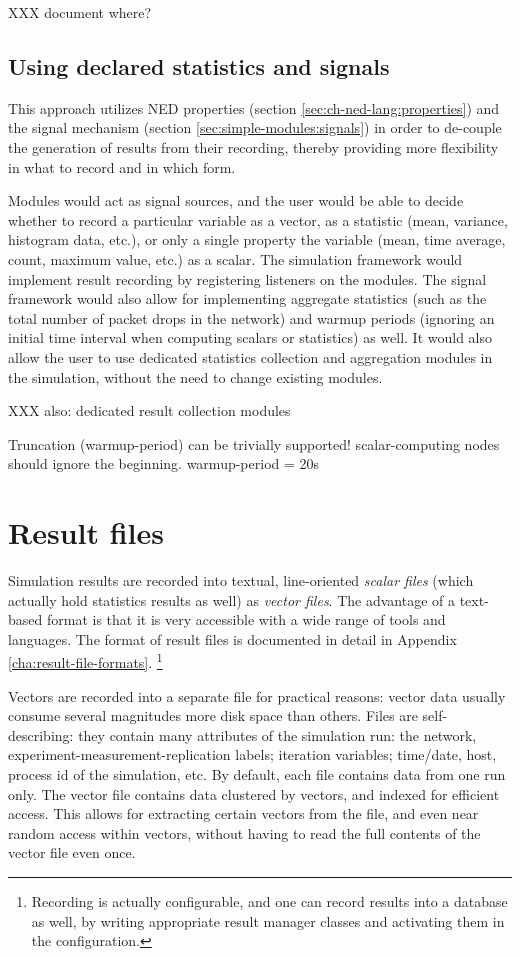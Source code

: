 XXX document where?

\subsection{Using declared statistics and signals}

This approach utilizes NED properties (section \ref{sec:ch-ned-lang:properties})
and the signal mechanism (section \ref{sec:simple-modules:signals})
in order to de-couple the generation of results from their recording,
thereby providing more flexibility in what to record and in which form.

Modules would act as signal sources, and the user would be able to decide
whether to record a particular variable as a vector, as a statistic (mean,
variance, histogram data, etc.), or only a single property the variable
(mean, time average, count, maximum value, etc.) as a scalar. The
simulation framework would implement result recording by registering
listeners on the modules. The signal framework would also allow for
implementing aggregate statistics (such as the total number of packet drops
in the network) and warmup periods (ignoring an initial time interval when
computing scalars or statistics) as well. It would also allow the user to
use dedicated statistics collection and aggregation modules in the
simulation, without the need to change existing modules.


XXX also: dedicated result collection modules

Truncation (warmup-period) can be trivially supported! scalar-computing nodes should ignore the beginning.
warmup-period = 20s

\section{Result files}

Simulation results are recorded into textual, line-oriented \textit{scalar
files} (which actually hold statistics results as well) as \textit{vector
files}. The advantage of a text-based format is that it is very accessible
with a wide range of tools and languages. The format of result files is
documented in detail in Appendix \ref{cha:result-file-formats}.
  \footnote{Recording is actually configurable, and one can record
  results into a database as well, by writing appropriate result
  manager classes and activating them in the configuration.}

Vectors are recorded into a separate file for practical reasons: vector
data usually consume several magnitudes more disk space than others. Files
are self-describing: they contain many attributes of the simulation run:
the network, experiment-measurement-replication labels; iteration
variables; time/date, host, process id of the simulation, etc. By default,
each file contains data from one run only.
The vector file contains data clustered by vectors, and indexed for
efficient access. This allows for extracting certain vectors from the file,
and even near random access within vectors, without having to read the full
contents of the vector file even once.

